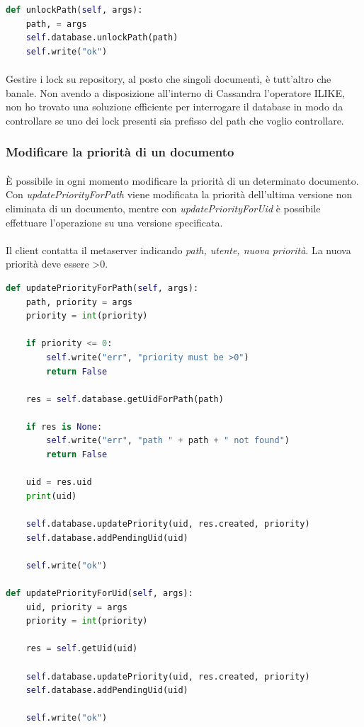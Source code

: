 \documentclass{article}
\begin{document}
\begin{lstlisting}[language=Python, title=Metaserver]
def unlockPath(self, args):
    path, = args
    self.database.unlockPath(path)
    self.write("ok")
\end{lstlisting}

\paragraph{} Gestire i lock su repository, al posto che singoli documenti, è tutt'altro che banale. Non avendo a disposizione all'interno di Cassandra l'operatore ILIKE, non ho trovato una soluzione efficiente per interrogare il database in modo da controllare se uno dei lock presenti sia prefisso del path che voglio controllare. 

\subsubsection{Modificare la priorità di un documento}

\paragraph{} È possibile in ogni momento modificare la priorità di un determinato documento. Con \emph{updatePriorityForPath} viene modificata la priorità dell'ultima versione non eliminata di un documento, mentre con \emph{updatePriorityForUid} è possibile effettuare l'operazione su una versione specificata. 

\paragraph{} Il client contatta il metaserver indicando \emph{path, utente, nuova priorità}. La nuova priorità deve essere >0. 

\begin{lstlisting}[language=Python, title=Metaserver]
def updatePriorityForPath(self, args):
    path, priority = args
    priority = int(priority)

    if priority <= 0:
        self.write("err", "priority must be >0")
        return False

    res = self.database.getUidForPath(path)

    if res is None:
        self.write("err", "path " + path + " not found")
        return False

    uid = res.uid
    print(uid)

    self.database.updatePriority(uid, res.created, priority)
    self.database.addPendingUid(uid)

    self.write("ok")

def updatePriorityForUid(self, args):
    uid, priority = args
    priority = int(priority)

    res = self.getUid(uid)

    self.database.updatePriority(uid, res.created, priority)
    self.database.addPendingUid(uid)

    self.write("ok")
\end{lstlisting}
\end{document}
